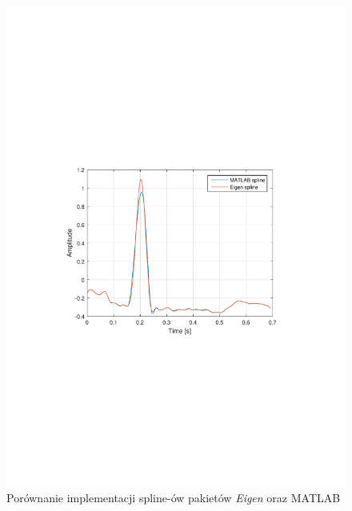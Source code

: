 \begin{figure}[!htb]
    \begin{center}
        \includegraphics[width=13cm,trim=4cm 9.5cm 4cm 10cm,clip]
        {../img/spline_comp.pdf}
    \end{center}
    \caption{Porównanie implementacji spline-ów pakietów \textit{Eigen} oraz
    \textrm{MATLAB}}
    \label{rys:comp_spline}
\end{figure}

